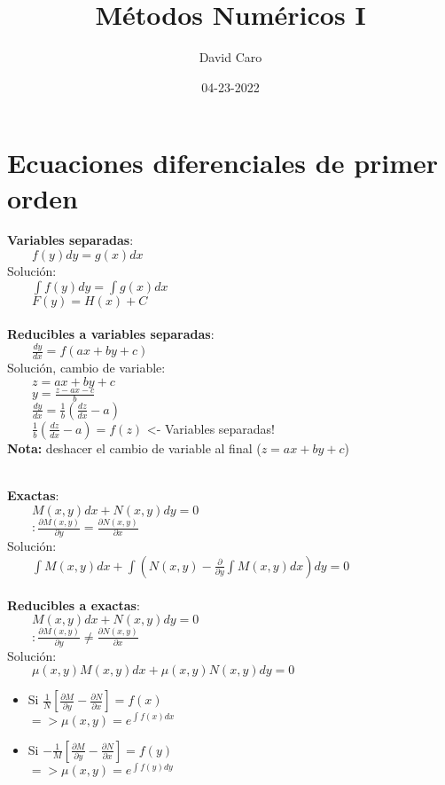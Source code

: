 \documentclass[a4paper,landscape,10pt]{cheatsheet}
\title{Métodos Numéricos I}
\author{David Caro}
\date{04-23-2022}
\begin{document}
\maketitle

\section{Ecuaciones diferenciales de primer orden}
\textbf{Variables separadas}:\\
$\qquad f(y)dy=g(x)dx$\\
Solución:\\
$\qquad \int f(y)dy=\int g(x)dx$\\
$\qquad F(y)=H(x)+C$\\

\hfill\\
\textbf{Reducibles a variables separadas}:\\
$\qquad \frac{dy}{dx}=f(ax+by+c)$\\
Solución, cambio de variable:\\
$\qquad z=ax+by+c$\\
$\qquad y=\frac{z-ax-c}{b}$\\
$\qquad \frac{dy}{dx}=\frac{1}{b}\left(\frac{dz}{dx}-a\right)$\\
$\qquad \frac{1}{b}\left(\frac{dz}{dx}-a\right)=f(z)$  <- Variables separadas!\\
\qquad\textbf{Nota:} deshacer el cambio de variable al final ($z=ax+by+c$)


\hfill\\
\textbf{Exactas}:\\
$\qquad M(x,y)dx+N(x,y)dy=0$\\
$\qquad :\frac{\partial M(x,y)}{\partial y}=\frac{\partial N(x,y)}{\partial x}$\\
Solución:\\
$\qquad \int M(x,y)dx + \int\left(N(x,y)-\frac{\partial}{\partial y}\int M(x,y)dx\right)dy = 0$\\

\hfill\\
\textbf{Reducibles a exactas}:\\
$\qquad M(x,y)dx+N(x,y)dy=0$\\
$\qquad :\frac{\partial M(x,y)}{\partial y}\neq\frac{\partial N(x,y)}{\partial x}$\\
Solución:\\
$\qquad \mu(x,y)M(x,y)dx+\mu(x,y)N(x,y)dy=0$\\
\begin{itemize}
  \item Si $\frac{1}{N}\left[\frac{\partial M}{\partial y}-\frac{\partial N}{\partial x}\right]=f(x)$\\
        $=> \mu(x,y)=e^{\int f(x)dx}$
  \item Si $-\frac{1}{M}\left[\frac{\partial M}{\partial y}-\frac{\partial N}{\partial x}\right]=f(y)$\\
        $=> \mu(x,y)=e^{\int f(y)dy}$
\end{itemize}
\end{document}
